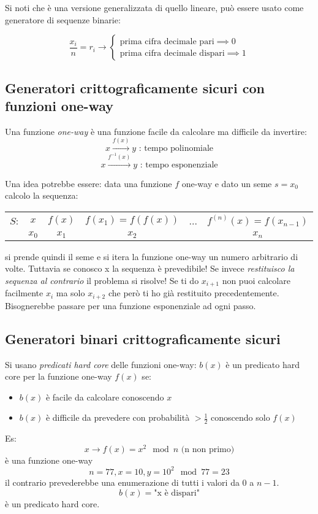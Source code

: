 Si noti che è una versione generalizzata di quello lineare, può essere usato come generatore di sequenze binarie:

\begin{equation}
    \frac{x_{i}}{n} = r_{i} \longrightarrow
    \begin{cases}
        \text{prima cifra decimale pari} \implies 0 \\
        \text{prima cifra decimale dispari} \implies 1
    \end{cases}
\end{equation}

\subsection{Generatori crittograficamente sicuri con funzioni one-way}
Una funzione \emph{one-way} è una funzione facile da calcolare ma difficile da invertire:
$$ x \xrightarrow{f(x)} y \text{ : tempo polinomiale} $$
$$ x \xrightarrow{f^{-1}(x)} y \text{ : tempo esponenziale} $$

Una idea potrebbe essere: data una funzione $f$ one-way e dato un seme $s = x_{0}$ calcolo la sequenza:
\begin{table}[!ht]
    \centering
    \begin{tabular}{c | c c c c c}
        $S$: & $x$ & $f(x)$ & $f(x_{1}) = f(f(x))$ & ... & $f^{(n)}(x) = f(x_{n-1})$ \\
         & $x_{0}$ & $x_{1}$ & $x_{2}$ & & $x_{n}$ \\
    \end{tabular}
\end{table}

si prende quindi il seme e si itera la funzione one-way un numero arbitrario di volte. Tuttavia se conosco x la sequenza è prevedibile! Se invece \emph{restituisco la sequenza al contrario} il problema si risolve! Se ti do $x_{i+1}$ non puoi calcolare facilmente $x_{i}$ ma solo $x_{i+2}$ che però ti ho già restituito precedentemente. Bisognerebbe passare per una funzione esponenziale ad ogni passo.

\subsection{Generatori binari crittograficamente sicuri}
Si usano \emph{predicati hard core} delle funzioni one-way: $b(x)$ è un predicato hard core per la funzione one-way $f(x)$ se:
\begin{itemize}
    \item $b(x)$ è facile da calcolare conoscendo $x$
    \item $b(x)$ è difficile da prevedere con probabilità $> \frac{1}{2}$ conoscendo solo $f(x)$
\end{itemize}
Es:
$$ x \xrightarrow{} f(x) = x^2 \mod n \text{ (n non primo)} $$
è una funzione one-way
$$ n = 77, x = 10, y = 10^{2} \mod 77 = 23 $$
il contrario prevederebbe una enumerazione di tutti i valori da 0 a $n-1$.
$$ b(x) = \text{"x è dispari"} $$
è un predicato hard core.


